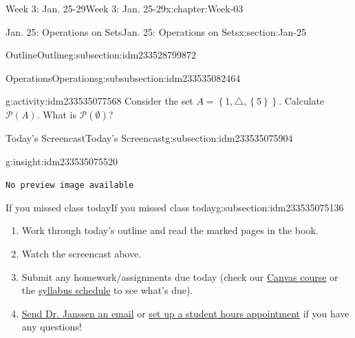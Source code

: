 \documentclass[oneside,10pt,]{book}
\newcommand{\mono}[1]{\texttt{#1}}
\numberwithin{equation}{section}
\newlength{\qrsize}
\newlength{\previewwidth}
\newcommand{\set}[1]{\left\{ {#1} \right\}}
\def\pow{{\mathcal P}}
\newcommand{\pow}{\mathcal P}
\begin{document}
\begin{chapterptx}{Week 3: Jan. 25-29}{}{Week 3: Jan. 25-29}{}{}{x:chapter:Week-03}
\begin{sectionptx}{Jan. 25: Operations on Sets}{}{Jan. 25: Operations on Sets}{}{}{x:section:Jan-25}
\begin{subsectionptx}{Outline}{}{Outline}{}{}{g:subsection:idm233528799872}
\begin{subsubsectionptx}{Operations}{}{Operations}{}{}{g:subsubsection:idm233535082464}
\begin{activity}{}{g:activity:idm233535077568}
Consider the set \(A = \set{1,\triangle,\set{5}}\). Calculate \(\pow(A)\). What is \(\pow(\emptyset)\)?%
\end{activity}%
\end{subsubsectionptx}
\end{subsectionptx}
%
%
\typeout{************************************************}
\typeout{************************************************}
%
\begin{subsectionptx}{Today's Screencast}{}{Today's Screencast}{}{}{g:subsection:idm233535075904}
\begin{insight}{}{g:insight:idm233535075520}%
\setlength{\qrsize}{9em}
\setlength{\previewwidth}{\linewidth}
\addtolength{\previewwidth}{-\qrsize}
\begin{tcbraster}[raster columns=2, raster column skip=1pt, raster halign=center, raster force size=false, raster left skip=0pt, raster right skip=0pt]%
\begin{tcolorbox}[previewstyle, width=\previewwidth]%
\mono{No preview image available}%
\end{tcolorbox}%
\begin{tcolorbox}[qrstyle]%
[QR LINK]\end{tcolorbox}%
\end{tcbraster}%
\end{insight}
\end{subsectionptx}
%
%
\typeout{************************************************}
\typeout{************************************************}
%
\begin{subsectionptx}{If you missed class today}{}{If you missed class today}{}{}{g:subsection:idm233535075136}
%
\begin{enumerate}
\item{}Work through today's outline and read the marked pages in the book.%
\item{}Watch the screencast above.%
\item{}Submit any homework\slash{}assignments due today (check our \href{https://dordt.instructure.com/courses/3110050}{Canvas course} or the \href{https://prof.mkjanssen.org/ds/index.html\#schedule}{syllabus schedule} to see what's due).%
\item{}\href{mailto:mike.janssen@dordt.edu}{Send Dr. Janssen an email} or \href{https://calendly.com/mkjanssen/student-hours}{set up a student hours appointment} if you have any questions!%
\end{enumerate}

\end{subsectionptx}
\end{sectionptx}
\end{chapterptx}
\end{document}
